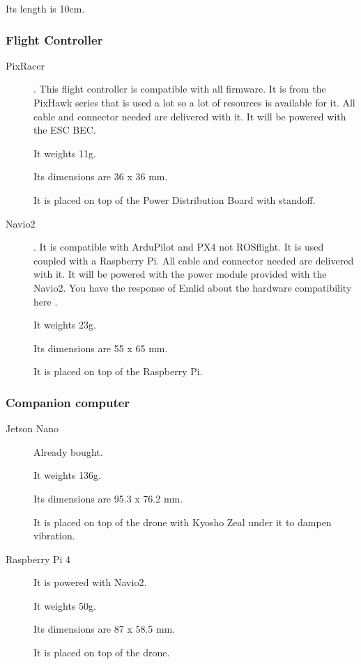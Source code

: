Its length is 10cm.

\subsubsection{Flight Controller}
\begin{description}
    \item[PixRacer] \cite{mrobotics_pixracer}. This flight controller is compatible with all firmware. It is from the PixHawk series that is used a lot so a lot of resources is available for it. All cable and connector needed are delivered with it. It will be powered with the ESC BEC.

          It weights 11g.

          Its dimensions are 36 x 36 mm.

          It is placed on top of the Power Distribution Board with standoff.

    \item[Navio2] \cite{emlid_navio2}. It is compatible with ArduPilot and PX4 not ROSflight. It is used coupled with a Raspberry Pi. All cable and connector needed are delivered with it. It will be powered with the power module \cite{emlid_power_module} provided with the Navio2. You have the response of Emlid about the hardware compatibility here \cite{emlid_rpi_compatibility}.

          It weights 23g.

          Its dimensions are 55 x 65 mm.

          It is placed on top of the Raspberry Pi.
\end{description}

\subsubsection{Companion computer}

\begin{description}
    \item[Jetson Nano] Already bought.

          It weights 136g.

          Its dimensions are 95.3 x 76.2 mm.

          It is placed on top of the drone with Kyosho Zeal under it to dampen vibration.

    \item[Raspberry Pi 4] It is powered with Navio2.

          It weights 50g.

          Its dimensions are 87 x 58.5 mm.

          It is placed on top of the drone.
\end{description}


